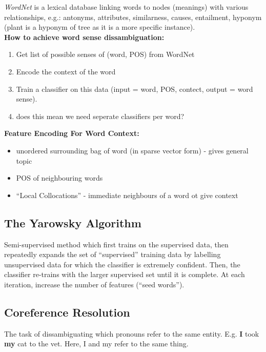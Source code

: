\documentclass[]{article}
\begin{document}
	\textit{WordNet} is a lexical database linking words to nodes (meanings) with various relationships, e.g.: antonyms, attributes, similarness, causes, entailment, hyponym (plant is a hyponym of tree as it is a more specific instance). \\
	
	\textbf{How to achieve word sense dissambiguation:} 
	
	\begin{enumerate}
	 \item Get list of possible senses of (word, POS) from WordNet
	 \item Encode the context of the word
	 \item Train a classifier on this data (input = word, POS, contect, output = word sense).
	 \item does this mean we need seperate classifiers per word?
	\end{enumerate}
    
    \textbf{Feature Encoding For Word Context:} \\
	
	\begin{itemize}
	 \item unordered surrounding bag of word (in sparse vector form) - gives general topic
	 \item POS of neighbouring words
	 \item ``Local Collocations'' - immediate neighbours of a word ot give context
	\end{itemize}

	\subsection{The Yarowsky Algorithm}
	Semi-supervised method which first trains on the supervised data, then repeatedly expands the set of ``supervised'' training data by labelling unsupervised data for which the classifier is extremely confident. Then, the classifier re-trains with the larger supervised set until it is complete. At each iteration, increase the number of features (``seed words'').
	
	\subsection{Coreference Resolution}
	The task of dissambiguating which pronouns refer to the same entity. E.g. \textbf{I} took \textbf{my} cat to the vet. Here, I and my refer to the same thing.
	
\end{document}

